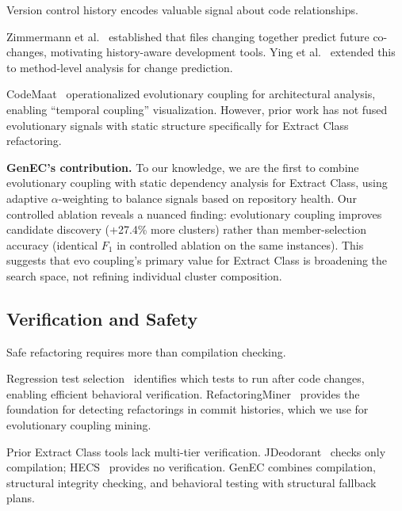 \documentclass[sigconf]{acmart}
\begin{document}
Version control history encodes valuable signal about code relationships.

Zimmermann et al.~\cite{Zimmermann2005MiningHistories} established that files
changing together predict future co-changes, motivating history-aware
development tools. Ying et al.~\cite{Ying2004ChangePrediction} extended this to
method-level analysis for change prediction.

CodeMaat~\cite{Tornhill2015CrimeScene} operationalized evolutionary coupling for
architectural analysis, enabling ``temporal coupling'' visualization. However,
prior work has not fused evolutionary signals with static structure specifically
for Extract Class refactoring.

\textbf{GenEC's contribution.}  To our knowledge, we are the first to combine evolutionary
coupling with static dependency analysis for Extract Class, using adaptive
$\alpha$-weighting to balance signals based on repository health. Our controlled
ablation reveals a nuanced finding: evolutionary coupling improves candidate
discovery (+27.4\% more clusters) rather than member-selection accuracy
(identical $F_1$ in controlled ablation on the same instances). This suggests
that evo coupling's primary value for Extract Class is broadening the search
space, not refining individual cluster composition.

\subsection{Verification and Safety}
\label{sec:rw-safety}

Safe refactoring requires more than compilation checking.

Regression test selection~\cite{Rothermel1996Regression} identifies which tests
to run after code changes, enabling efficient behavioral verification.
RefactoringMiner~\cite{Tsantalis2022RefactoringMiner} provides the foundation
for detecting refactorings in commit histories, which we use for
evolutionary coupling mining.

Prior Extract Class tools lack multi-tier verification.
JDeodorant~\cite{Fokaefs2011JDeodorant} checks only compilation;
HECS~\cite{Cui2024HECS} provides no verification. GenEC combines compilation,
structural integrity checking, and behavioral testing with structural fallback
plans.
\end{document}
